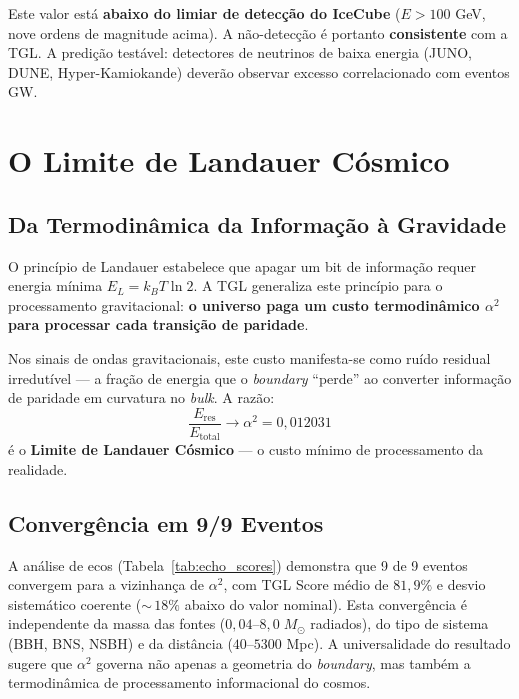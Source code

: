 \documentclass[12pt,a4paper,twoside]{article}
\newcommand{\alphaii}{\alpha^{2}}
\newcommand{\boundary}{\textit{boundary}}
\newcommand{\bulk}{\textit{bulk}}
\begin{document}
Este valor est\'a \textbf{abaixo do limiar de detec\c{c}\~ao do IceCube} ($E > 100$ GeV, nove ordens de magnitude acima). A n\~ao-detec\c{c}\~ao \'e portanto \textbf{consistente} com a TGL. A predi\c{c}\~ao test\'avel: detectores de neutrinos de baixa energia (JUNO, DUNE, Hyper-Kamiokande) dever\~ao observar excesso correlacionado com eventos GW.



\section{O Limite de Landauer C\'osmico}


\subsection{Da Termodin\^amica da Informa\c{c}\~ao \`a Gravidade}

O princ\'ipio de Landauer estabelece que apagar um bit de informa\c{c}\~ao requer energia m\'inima $E_L = k_B T \ln 2$. A TGL generaliza este princ\'ipio para o processamento gravitacional: \textbf{o universo paga um custo termodin\^amico $\alphaii$ para processar cada transi\c{c}\~ao de paridade}.

Nos sinais de ondas gravitacionais, este custo manifesta-se como ru\'ido residual irredut\'ivel --- a fra\c{c}\~ao de energia que o \boundary{} ``perde'' ao converter informa\c{c}\~ao de paridade em curvatura no \bulk. A raz\~ao:
\begin{equation}
\frac{E_{\text{res}}}{E_{\text{total}}} \to \alphaii = 0{,}012031
\label{eq:landauer}
\end{equation}
\'e o \textbf{Limite de Landauer C\'osmico} --- o custo m\'inimo de processamento da realidade.



\subsection{Converg\^encia em 9/9 Eventos}

A an\'alise de ecos (Tabela~\ref{tab:echo_scores}) demonstra que 9 de 9 eventos convergem para a vizinhan\c{c}a de $\alphaii$, com TGL Score m\'edio de $81{,}9\%$ e desvio sistem\'atico coerente (${\sim}\,18\%$ abaixo do valor nominal). Esta converg\^encia \'e independente da massa das fontes ($0{,}04$--$8{,}0\;M_\odot$ radiados), do tipo de sistema (BBH, BNS, NSBH) e da dist\^ancia ($40$--$5300$ Mpc). A universalidade do resultado sugere que $\alphaii$ governa n\~ao apenas a geometria do \boundary, mas tamb\'em a termodin\^amica de processamento informacional do cosmos.
\end{document}
